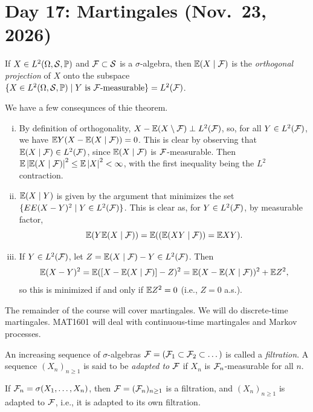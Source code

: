 \section{Day 17: Martingales (Nov.\ 23, 2026)}
\begin{theorem} \label{thm:cond_expectation_orthogonal_projection}
    If $X \in L^2(\Omega, \mathcal S, \mathbb P)$ and $\mathcal F \subset \mathcal S$ is a $\sigma$-algebra, then $\mathbb E(X \mid \mathcal F)$ is the \textit{orthogonal projection} of $X$ onto the subspace $\{X \in L^2(\Omega, \mathcal S, \mathbb P) \mid Y \text{ is $\mathcal F$-measurable}\} = L^2(\mathcal F)$.
\end{theorem}
We have a few consequnces of thie theorem.
\begin{enumerate}[(i)]
    \item By definition of orthogonality, $X - \mathbb E(X \setminus \mathcal F) \perp L^2(\mathcal F)$, so, for all $Y \in L^2(\mathcal F)$, we have $\mathbb E Y(X - \mathbb E(X \mid \mathcal F)) = 0$. This is clear by observing that $\mathbb E(X \mid \mathcal F) \in L^2(\mathcal F)$, since $\mathbb E(X \mid \mathcal F)$ is $\mathcal F$-measurable. Then $\mathbb E \left\lvert \mathbb E(X \mid \mathcal F) \right\rvert^2 \leq \mathbb E \left\lvert X \right\rvert^2 < \infty$, with the first inequality being the $L^2$ contraction.
    \item $\mathbb E(X \mid Y)$ is given by the argument that minimizes the set $\{EE (X - Y)^2 \mid Y \in L^2(\mathcal F)\}$. This is clear as, for $Y \in L^2(\mathcal F)$, by measurable factor,
    \[ \mathbb E(Y \mathbb E(X \mid \mathcal F)) = \mathbb E((\mathbb E(XY \mid \mathcal F)) = \mathbb E XY). \]
    \item If $Y \in L^2(\mathcal F)$, let $Z = \mathbb E(X \mid \mathcal F) - Y \in L^2(\mathcal F)$. Then
    \[ \mathbb E(X - Y)^2 = \mathbb E([X - \mathbb E(X \mid \mathcal F)] - Z)^2 = \mathbb E(X - \mathbb E(X \mid \mathcal F))^2 + \mathbb E Z^2, \]
    so this is minimized if and only if $\mathbb E Z^2 = 0$ (i.e., $Z = 0$ a.s.).
\end{enumerate}

{\color{amethyst} The remainder of the course will cover martingales. We will do discrete-time martingales. MAT1601 will deal with continuous-time martingales and Markov processes.}

\begin{definition}[Filtration] \label{defn:filtration}
    An increasing sequence of $\sigma$-algebras $\mathcal F = (\mathcal F_1 \subset \mathcal F_2 \subset \dots)$ is called a \textit{filtration}. A sequence $(X_n)_{n \geq 1}$ is said to be \textit{adapted to $\mathcal F$} if $X_n$ is $\mathcal F_n$-measurable for all $n$.
\end{definition}
If $\mathcal F_n = \sigma(X_1, \dots, X_n)$, then $\mathcal F = (\mathcal F_n)_{n \geq 1}$ is a filtration, and $(X_n)_{n \geq 1}$ is adapted to $\mathcal F$, i.e., it is adapted to its own filtration.

